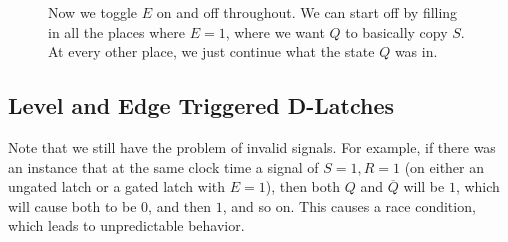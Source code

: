 \begin{example}
\begin{figure}[H]
      \caption{Now we toggle $E$ on and off throughout. We can start off by filling in all the places where $E = 1$, where we want $Q$ to basically copy $S$. At every other place, we just continue what the state $Q$ was in. } 
    \end{figure}
  \end{example}

\subsection{Level and Edge Triggered D-Latches}

  Note that we still have the problem of invalid signals. For example, if there was an instance that at the same clock time a signal of $S=1, R=1$ (on either an ungated latch or a gated latch with $E=1$), then both $Q$ and $\overline{Q}$ will be $1$, which will cause both to be $0$, and then $1$, and so on. This causes a race condition, which leads to unpredictable behavior. 


